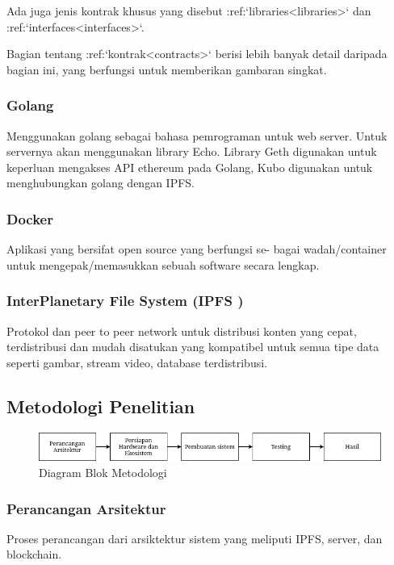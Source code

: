 Ada juga jenis kontrak khusus yang disebut :ref:`libraries<libraries>` dan :ref:`interfaces<interfaces>`.

Bagian tentang :ref:`kontrak<contracts>` berisi lebih banyak detail daripada bagian ini, yang berfungsi untuk memberikan gambaran singkat.


\subsubsection{Golang}
Menggunakan golang sebagai bahasa pemrograman untuk web server. Untuk servernya akan menggunakan library Echo. Library Geth
digunakan untuk keperluan mengakses API ethereum pada Golang, Kubo digunakan untuk menghubungkan golang dengan IPFS.

\subsubsection{Docker}
Aplikasi yang bersifat open source yang berfungsi se-
bagai wadah/container untuk mengepak/memasukkan sebuah
software secara lengkap.

\subsubsection{InterPlanetary File System (IPFS )}
Protokol dan peer to
peer network untuk distribusi konten yang cepat, terdistribusi
dan mudah disatukan yang kompatibel untuk semua tipe data
seperti gambar, stream video, database terdistribusi.

\subsection{Metodologi Penelitian}

\begin{figure} [ht] \centering
  \includegraphics[scale=0.55]{gambar/diagram_blok_metodologi.png}
  \caption{Diagram Blok Metodologi}
  \label{fig:Blueprint}
\end{figure}

\subsubsection{Perancangan Arsitektur}
Proses perancangan dari arsiktektur sistem yang meliputi IPFS, server, dan blockchain.

